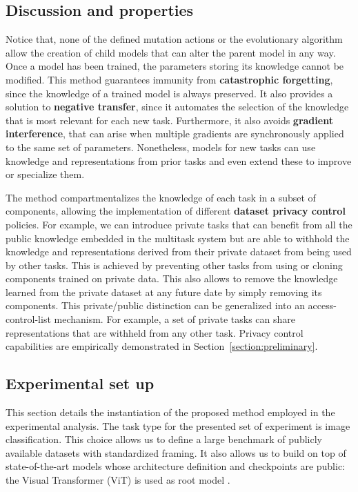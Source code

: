 \documentclass{article} \usepackage{iclr2023_conference,times}
\begin{document}
\subsection{Discussion and properties}
Notice that, none of the defined mutation actions or the evolutionary algorithm allow the creation of child models that can alter the parent model in any way.
Once a model has been trained, the parameters storing its knowledge cannot be modified.
This method guarantees immunity from \textbf{catastrophic forgetting}, since the knowledge of a trained model is always preserved.
It also provides a solution to \textbf{negative transfer}, since it automates the selection of the knowledge that is most relevant for each new task.
Furthermore, it also avoids \textbf{gradient interference}, that can arise when multiple gradients are synchronously applied to the same set of parameters.
Nonetheless, models for new tasks can use knowledge and representations from prior tasks and even extend these to improve or specialize them.

The method compartmentalizes the knowledge of each task in a subset of components, allowing the implementation of different \textbf{dataset privacy control} policies. For example, we can introduce private tasks that can benefit from all 
the public knowledge embedded in the multitask system but are able to withhold the knowledge and representations 
derived from their private dataset from being used by other tasks.
This is achieved by preventing other tasks from using or cloning components trained on private data.
This also allows to remove the knowledge learned from the private dataset at any future date by simply removing its components.
This private/public distinction can be generalized into an access- control-list mechanism.
For example, a set of private tasks can share representations that are withheld from any other task.
Privacy control capabilities are empirically demonstrated in Section~\ref{section:preliminary}.


\subsection{Experimental set up}
\label{section:experiments}

This section details the instantiation of the proposed method employed in the experimental analysis.
The task type for the presented set of experiment is image classification.
This choice allows us to define a large benchmark of publicly available datasets with standardized framing.
It also allows us to build on top of state-of-the-art models whose architecture definition and checkpoints are public:
the Visual Transformer (ViT) is used as root model \citep{Dosovitskiy2021AnII}.
\end{document}
